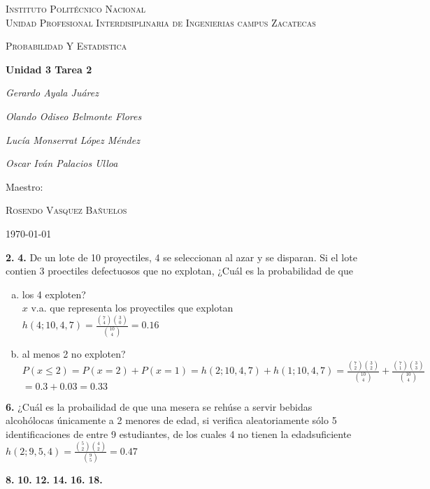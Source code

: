 \documentclass[12pt, letterpaper]{article}
\begin{document}
    \begin{titlepage}
        \centering
        {\scshape\LARGE Instituto Politécnico Nacional\\ Unidad Profesional Interdisiplinaria de Ingenierias campus Zacatecas\par}
        \vspace{1cm}
        {\scshape\Large Probabilidad Y Estadistica\par}
        \vspace{1.5cm}
        {\huge\bfseries Unidad 3 Tarea 2\par}
        \vspace{2cm}
        {\Large\itshape Gerardo Ayala Juárez\par}
        {\Large\itshape Olando Odiseo Belmonte Flores\par}
        {\Large\itshape Lucía Monserrat López Méndez\par}
        {\Large\itshape Oscar Iván Palacios Ulloa\par}
        \vfill
        Maestro:\par
        \textsc{
        Rosendo Vasquez Bañuelos}
        \vfill
        {\large \today \par}
    \end{titlepage}
    \textbf{2. }\vskip1cm
    \textbf{4. }De un lote de 10 proyectiles, 4 se seleccionan al azar y se disparan. Si el lote contien 3 proectiles
    defectuosos que no explotan, ¿Cuál es la probabilidad de que
    \begin{enumerate}[a)]
        \item los 4 exploten?\\
            $x$ v.a. que representa los proyectiles que explotan\vskip0.3cm
            $h(4;10,4,7)=\displaystyle\frac{\displaystyle\binom{7}{4}\displaystyle\binom{3}{0}
            }{\displaystyle\binom{10}{4}}=0.16$
        \item al menos 2 no exploten?\vskip0.3cm
            $P(x\leq 2)=P(x=2)+P(x=1)=h(2;10,4,7)+h(1;10,4,7)=\displaystyle\frac{\displaystyle\binom{7}{2}\displaystyle\binom{3}{2}}{\displaystyle\binom{10}{4}}+
            \displaystyle\frac{\displaystyle\binom{7}{1}\displaystyle\binom{3}{3}}{\displaystyle\binom{10}{4}}$\vskip0.3cm
            $=0.3+0.03=0.33$
    \end{enumerate}\vskip1cm

    \textbf{6. }¿Cuál es la probailidad de que una mesera se rehúse a servir bebidas alcohólocas únicamente a 2 menores
    de edad, si verifica aleatoriamente sólo 5 identificaciones de entre 9 estudiantes, de los cuales 4 no tienen la
    edadsuficiente\vskip0.3cm
            $h(2;9,5,4)=\displaystyle\frac{\displaystyle\binom{5}{2}\displaystyle\binom{4}{2}}{\displaystyle\binom{9}{5}}=0.47$

    \textbf{8. }\vskip1cm
    \textbf{10. }\vskip1cm
    \textbf{12. }\vskip1cm
    \textbf{14. }\vskip1cm
    \textbf{16. }\vskip1cm
    \textbf{18. }\vskip1cm
\end{document}
